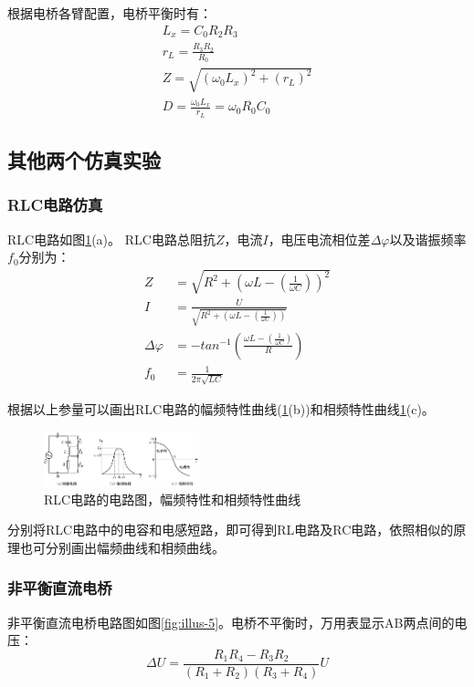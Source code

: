\documentclass[10pt,a4paper,twocolumn,twoside,UTF8]{ctexart}
\begin{document}
		根据电桥各臂配置，电桥平衡时有：
			\begin{gather}
				L_x = C_0R_2R_3 \label{eq:2.1} \\
				r_L = \frac{R_3R_2}{R_0} \label{eq:2.2} \\
				Z = \sqrt{(\omega_0 L_x)^2+(r_L)^2} \label{eq:2.3} \\
				D = \frac{\omega_0L_x}{r_L} = \omega_0R_0C_0 \label{eq:2.4}
			\end{gather}
	
	\subsection{其他两个仿真实验}
		\subsubsection{RLC电路仿真}
		RLC电路如图\ref{fig:illus-4}(a)。
		RLC电路总阻抗$Z$，电流$I$，电压电流相位差$\Delta\varphi$以及谐振频率$f_0$分别为：
		\begin{align}
			Z &= \sqrt{R^2+(\omega L-(\frac{1}{\omega C}))^2} \\
			I &= \frac{U}{\sqrt{R^2+(\omega L-(\frac{1}{\omega C}))}} \\
			\Delta \varphi &= -tan^{-1}(\frac{\omega L-(\frac{1}{\omega C})}{R}) \\
			f_0 &= \frac{1}{2\pi\sqrt{LC}}
		\end{align}

		根据以上参量可以画出RLC电路的幅频特性曲线(\ref{fig:illus-4}(b))和相频特性曲线\ref{fig:illus-4}(c)。
		\begin{figure}[htbp]
			\centering
			\includegraphics[width=0.4\textwidth]{attachments/illus-4.png}
			\caption{RLC电路的电路图，幅频特性和相频特性曲线}
			\label{fig:illus-4}
		\end{figure}

		分别将RLC电路中的电容和电感短路，即可得到RL电路及RC电路，依照相似的原理也可分别画出幅频曲线和相频曲线。

		\subsubsection{非平衡直流电桥}
		非平衡直流电桥电路图如图\ref{fig:illus-5}。电桥不平衡时，万用表显示AB两点间的电压：
		\begin{equation}
			\Delta U = \frac{R_1R_4-R_3R_2}{(R_1+R_2)(R_3+R_4)}U \label{eq:3}
		\end{equation}
\end{document}
